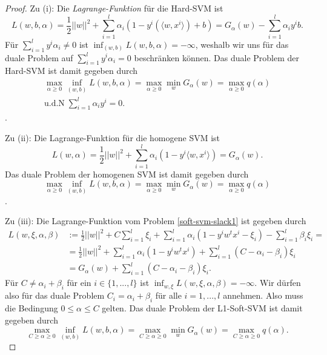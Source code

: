 \begin{proof}
Zu (i): Die \emph{Lagrange-Funktion} für die Hard-SVM ist
$$
L(w,b,\alpha) = \frac{1}{2}||w||^2 + \sum_{i=1}^{l}\alpha_i(1-y^i(
\langle w,x^i \rangle) + b) = G_{\alpha}(w) - \sum_{i=1}^{l}\alpha_i y^i b.
$$
Für $\sum_{i=1}^{l}y^i \alpha_i \neq 0$ ist $\inf_{(w,b)} L(w,b,\alpha) = -\infty$, weshalb wir uns für das duale Problem auf $\sum_{i=1}^{l}y^i \alpha_i = 0$ beschränken können. Das duale Problem der Hard-SVM ist damit gegeben durch
$$
\begin{aligned}
\max_{\alpha \geq 0} \inf_{(w,b)} L(w,b,\alpha) = 
\max_{\alpha \geq 0} \min_w G_{\alpha}(w) = \max_{\alpha \geq 0}q(\alpha) \\
\text{u.d.N} \; \sum_{i=1}^l \alpha_i y^i = 0.
\end{aligned}
$$.

Zu (ii): Die Lagrange-Funktion für die homogene SVM ist
$$
L(w,\alpha) = \frac{1}{2}||w||^2 + \sum_{i=1}^{l}\alpha_i(1-y^i 
\langle w,x^i \rangle) = G_{\alpha}(w).
$$
Das duale Problem der homogenen SVM ist damit gegeben durch
$$
\max_{\alpha \geq 0} \inf_{(w,b)} L(w,b,\alpha) = 
\max_{\alpha \geq 0} \min_w G_{\alpha}(w) = \max_{\alpha \geq 0}q(\alpha)
$$.


Zu (iii): Die Lagrange-Funktion vom Problem \ref{soft-svm-slack1} ist gegeben durch 
$$
\label{lagrange-l1-softsvm1}
\begin{aligned}
L(w, \xi, \alpha, \beta) &:= \tfrac{1}{2}||w||^2 + C \sum_{i=1}^l \xi_i 
+ \sum_{i=1}^{l}{\alpha_i (1-y^i w^t x^i - \xi_i)} - \sum_{i=1}^{l} \beta_i \xi_i = \\
&= \tfrac{1}{2} ||w||^2 + \sum_{i=1}^{l}{\alpha_i (1-y^i w^t x^i)} + \sum_{i=1}^{l}(C-\alpha_i - \beta_i)\xi_i \\
&= G_{\alpha}(w) + \sum_{i=1}^{l}(C-\alpha_i - \beta_i)\xi_i.
\end{aligned}
$$
Für $C \neq \alpha_i + \beta_i$ für ein $i \in \{1, ..., l\}$ ist $\inf_{w,\xi}L(w,\xi,\alpha,\beta) = -\infty$. Wir dürfen also für das duale Problem $C_i = \alpha_i+\beta_i$ für alle $i = 1,...,l$ annehmen. Also muss die Bedingung $0 \leq \alpha \leq C$ gelten. Das duale Problem der L1-Soft-SVM ist damit gegeben durch
$$
\max_{C \geq \alpha \geq 0} \inf_{(w,b)} L(w,b,\alpha) = 
\max_{C \geq \alpha \geq 0} \min_w G_{\alpha}(w) = \max_{C \geq \alpha \geq 0}q(\alpha).
$$


\end{proof}
